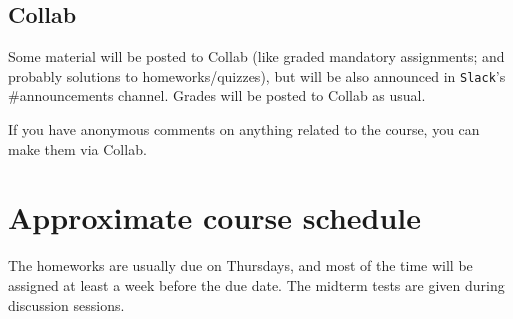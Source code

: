 \documentclass[oneside,11pt]{amsart}
\begin{document}
\subsection{Collab}

Some material will be posted to Collab (like graded mandatory assignments; and probably solutions to homeworks/quizzes), but will be also announced in \texttt{Slack}'s \#announcements channel. Grades will be posted to Collab as usual.

If you have anonymous comments on anything related to the course, you can make them via Collab.

\section{Approximate course schedule}

The homeworks are usually due on Thursdays, and most of the time will be assigned at least a week before the due date. The midterm tests are given during discussion sessions.

\vspace{5pt}
\end{document}
